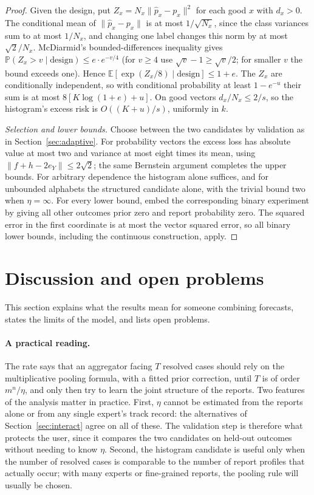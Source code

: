 \documentclass[11pt,a4paper]{article}
\theoremstyle{remark}
\newcommand{\E}{\mathbb E}
\newcommand{\PP}{\mathbb P}
\begin{document}
\begin{proof}
Given the design, put $Z_x=N_x\|\widehat p_x-p_x\|^2$ for each good $x$ with $d_x>0$. The conditional mean of $\|\widehat p_x-p_x\|$ is at most $1/\sqrt{N_x}$, since the class variances sum to at most $1/N_x$, and changing one label changes this norm by at most $\sqrt2/N_x$. McDiarmid's bounded-differences inequality gives $\PP(Z_x>v\mid\text{design})\le e\cdot e^{-v/4}$ (for $v\ge4$ use $\sqrt v-1\ge\sqrt v/2$; for smaller $v$ the bound exceeds one). Hence $\E[\exp(Z_x/8)\mid\text{design}]\le1+e$. The $Z_x$ are conditionally independent, so with conditional probability at least $1-e^{-u}$ their sum is at most $8[K\log(1+e)+u]$. On good vectors $d_x/N_x\le2/s$, so the histogram's excess risk is $O((K+u)/s)$, uniformly in $k$.

\emph{Selection and lower bounds.} Choose between the two candidates by validation as in Section~\ref{sec:adaptive}. For probability vectors the excess loss has absolute value at most two and variance at most eight times its mean, using $\|f+h-2e_Y\|\le2\sqrt2$; the same Bernstein argument completes the upper bounds. For arbitrary dependence the histogram alone suffices, and for unbounded alphabets the structured candidate alone, with the trivial bound two when $\eta=\infty$. For every lower bound, embed the corresponding binary experiment by giving all other outcomes prior zero and report probability zero. The squared error in the first coordinate is at most the vector squared error, so all binary lower bounds, including the continuous construction, apply.
\end{proof}

\section{Discussion and open problems}\label{sec:disc}
This section explains what the results mean for someone combining forecasts, states the limits of the model, and lists open problems.

\paragraph{A practical reading.} The rate says that an aggregator facing $T$ resolved cases should rely on the multiplicative pooling formula, with a fitted prior correction, until $T$ is of order $m^n/\eta$, and only then try to learn the joint structure of the reports. Two features of the analysis matter in practice. First, $\eta$ cannot be estimated from the reports alone or from any single expert's track record: the alternatives of Section~\ref{sec:interact} agree on all of these. The validation step is therefore what protects the user, since it compares the two candidates on held-out outcomes without needing to know $\eta$. Second, the histogram candidate is useful only when the number of resolved cases is comparable to the number of report profiles that actually occur; with many experts or fine-grained reports, the pooling rule will usually be chosen.
\end{document}
